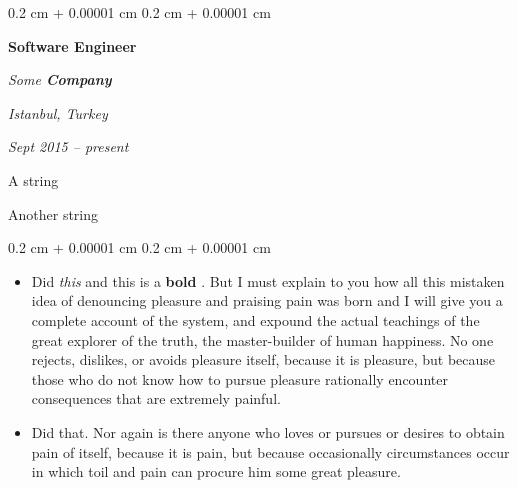 \documentclass[10pt, letterpaper]{article}
\newenvironment{summary}{
    \begin{description}[
        topsep=0.10 cm,
        parsep=0.10 cm,
        partopsep=0pt,
        itemsep=0pt,
        leftmargin=0.4 cm + 10pt
    ]
}{
    \end{description}
} %
\newenvironment{highlights}{
    \begin{itemize}[
        topsep=0.10 cm,
        parsep=0.10 cm,
        partopsep=0pt,
        itemsep=0pt,
        leftmargin=0.4 cm + 10pt
    ]
}{
    \end{itemize}
} %
\newenvironment{onecolentry}{
    \begin{adjustwidth}{
        0.2 cm + 0.00001 cm
    }{
        0.2 cm + 0.00001 cm
    }
}{
    \end{adjustwidth}
} %
\newenvironment{twocolentry}[2][]{
    \onecolentry
    \def\secondColumn{#2}
    \setcolumnwidth{\fill, 4.5 cm}
    \begin{paracol}{2}
}{
    \switchcolumn \raggedleft \secondColumn
    \end{paracol}
    \endonecolentry
} %
\let\hrefWithoutArrow\href
\renewcommand{\href}[2]{\hrefWithoutArrow{#1}{\ifthenelse{\equal{#2}{}}{ }{#2 }\raisebox{.15ex}{\footnotesize \faExternalLink*}}}
\begin{document}
        \begin{twocolentry}{
        \textit{Istanbul, Turkey}    
            
        \textit{Sept 2015 – present}}
            \textbf{Software Engineer}
            
            \textit{Some \textbf{Company}}
        \end{twocolentry}
            \begin{summary}
                \item A string
                \item Another string
            \end{summary}
        \vspace{0.10 cm}
        \begin{onecolentry}
            \begin{highlights}
                \item Did \textit{this} and this is a \textbf{bold} \href{https://example.com}{link}. But I must explain to you how all this mistaken idea of denouncing pleasure and praising pain was born and I will give you a complete account of the system, and expound the actual teachings of the great explorer of the truth, the master-builder of human happiness. No one rejects, dislikes, or avoids pleasure itself, because it is pleasure, but because those who do not know how to pursue pleasure rationally encounter consequences that are extremely painful.
                \item Did that. Nor again is there anyone who loves or pursues or desires to obtain pain of itself, because it is pain, but because occasionally circumstances occur in which toil and pain can procure him some great pleasure.
            \end{highlights}
        \end{onecolentry}


        \vspace{0.2 cm}
\end{document}
